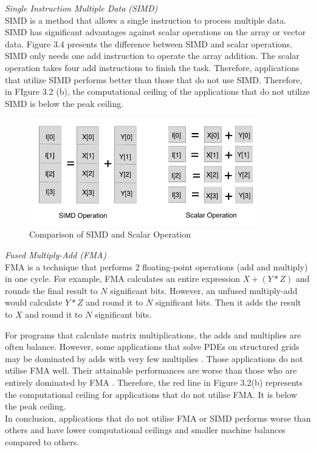 \textit{Single Instruction Multiple Data (SIMD)}\\
SIMD is a method that allows a single instruction to process multiple data. SIMD has significant advantages against scalar operations on the array or vector data. Figure 3.4 presents the difference between SIMD and scalar operations. SIMD only needs one add instruction to operate the array addition. The scalar operation takes four add instructions to finish the task. Therefore, applications that utilize SIMD performs better than those that do not use SIMD. Therefore, in FIgure 3.2 (b), the computational ceiling of the applications that do not utilize SIMD is below the peak ceiling.

\begin{figure} [h] %
	\centering   %
	\includegraphics[width=10cm]{pictures/SIMD}
	\caption{Comparison of SIMD and Scalar Operation}
\end{figure}

\textit{Fused Multiply-Add (FMA)}\\
FMA is a technique that performs 2 floating-point operations (add and multiply) in one cycle. For example, FMA calculates an entire expression $X + (Y*Z)$ and rounds the final result to $N$ significant bits.  However, an unfused multiply-add would calculate $Y*Z$ and round it to $N$ significant bits. Then it adds the result to $X$ and round it to $N$ significant bits. 

For programs that calculate matrix multiplications, the adds and multiplies are often balance. However, some applications that solve PDEs on structured grids may be dominated by adds with very few multiplies \cite{12}. Those applications do not utilise FMA well. Their attainable performances are worse than those who are entirely dominated by FMA \cite{12}. Therefore, the red line in Figure 3.2(b) represents the computational ceiling for applications that do not utilise FMA. It is below the peak ceiling.\\
In conclusion, applications that do not utilise FMA or SIMD performs worse than others and have lower computational ceilings and smaller machine balances compared to others. 



